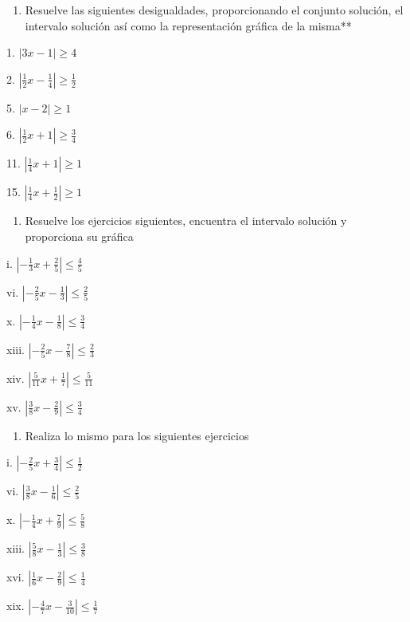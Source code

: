 \documentclass[]{book}
\providecommand{\tightlist}{%
  \setlength{\itemsep}{0pt}\setlength{\parskip}{0pt}}
\begin{document}
\begin{enumerate}
\def\labelenumi{\arabic{enumi}.}
\setcounter{enumi}{20}
\tightlist
\item
  Resuelve las siguientes desigualdades, proporcionando el conjunto
  solución, el intervalo solución así como la representación gráfica de
  la misma**
\end{enumerate}

\begin{multicols}{2}
1. $|3x-1|\geq 4$

2. $|\frac{1}{2}x-\frac{1}{4}|\geq\frac{1}{2}$

5. $|x-2|\geq 1$

6. $|\frac{1}{2}x+1|\geq\frac{3}{4}$

11. $|\frac{1}{4}x+1|\geq 1$

15. $|\frac{1}{4}x+\frac{1}{2}|\geq 1$
\end{multicols}

\begin{enumerate}
\def\labelenumi{\arabic{enumi}.}
\setcounter{enumi}{21}
\tightlist
\item
  Resuelve los ejercicios siguientes, encuentra el intervalo solución y
  proporciona su gráfica
\end{enumerate}

\begin{multicols}{2}
i. $|-\frac{1}{3}x+\frac{2}{5}| \leq \frac{4}{5}$
    
vi. $|-\frac{2}{5}x-\frac{1}{3}| \leq \frac{2}{5}$

x. $|-\frac{1}{4}x-\frac{1}{8}| \leq \frac{3}{4}$
    
xiii. $|-\frac{2}{5}x-\frac{7}{8}| \leq \frac{2}{3}$
    
xiv. $|\frac{5}{11}x+\frac{1}{7}| \leq \frac{5}{11}$
    
xv. $|\frac{3}{8}x-\frac{2}{9}| \leq \frac{3}{4}$
\end{multicols}

\begin{enumerate}
\def\labelenumi{\arabic{enumi}.}
\setcounter{enumi}{22}
\tightlist
\item
  Realiza lo mismo para los siguientes ejercicios
\end{enumerate}

\begin{multicols}{2}
i. $|-\frac{2}{5}x+\frac{3}{4}| \leq \frac{1}{2}$
  
vi. $|\frac{3}{8}x-\frac{1}{6}| \leq \frac{2}{5}$
    
x. $|-\frac{1}{4}x+\frac{7}{9}| \leq \frac{5}{8}$
    
xiii. $|\frac{5}{8}x-\frac{1}{3}| \leq \frac{3}{8}$
    
xvi. $|\frac{1}{6}x-\frac{2}{9}| \leq \frac{1}{4}$
    
xix. $|-\frac{4}{7}x-\frac{3}{10}| \leq \frac{1}{7}$
\end{multicols}
\end{document}
